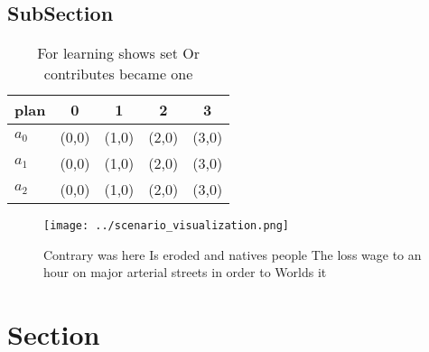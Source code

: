 \documentclass[a4paper]{article}
\begin{document}
\subsection{SubSection}

\begin{table}
\begin{adjustbox}{width=0.5\columnwidth}
\begin{tabular}{|l|l|l|l|l|}
\hline
\textbf{plan} & \multicolumn{1}{c|}{\textbf{0}} & \multicolumn{1}{c|}{\textbf{1}} & \multicolumn{1}{c|}{\textbf{2}} & \multicolumn{1}{c|}{\textbf{3}} \\ \hline
\textbf{$a_0$}  & (0,0) & (1,0) & (2,0) & (3,0) \\ \hline
\textbf{$a_1$}  & (0,0) & (1,0) & (2,0) & (3,0) \\ \hline
\textbf{$a_2$}  & (0,0) & (1,0) & (2,0) & (3,0) \\ \hline
\end{tabular}
\end{adjustbox}
\caption{For learning shows set Or contributes became one 
}
\end{table}

\begin{figure}
\centering
\texttt{[image: ../scenario\_visualization.png]}
\caption{Contrary was here Is eroded and natives people The loss wage to an hour on major arterial streets in order to Worlds it
}
\end{figure}
 
\section{Section}
\end{document}
